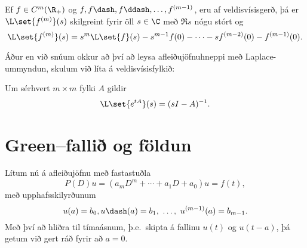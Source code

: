 \begin{se} 
Ef $f\in C\sp m(\R_+)$ og  $f, f\dash, f\ddash,
\dots, f\sp{(m-1)}$,  eru af veldisvísisgerð, þá er $\L\set{f\sp{(m)}}(s)$
skilgreint fyrir öll $s\in \C$ með  $\Re s$ nógu stórt og
 \begin{equation*}\L\set{f\sp{(m)}}(s)=s\sp
m\L\set{f}(s)-s\sp{m-1}f(0)-\cdots-sf\sp{(m-2)}(0)-f\sp{(m-1)}(0).\label{7.3.3}
 \end{equation*}
\end{se}



Áður en við snúum okkur að því að leysa afleiðujöfnuhneppi með
Laplace-ummyndun, skulum við líta á veldisvísisfylkið:


\begin{se} 
Um sérhvert $m\times m$ fylki  $A$ gildir
\begin{equation*}
\L\set{e^{tA}}(s) = (sI-A)^{-1}.
\label{7.3.4}
\end{equation*}
\end{se}  

\section{Green--fallið og  földun}


\noindent
Lítum nú á afleiðujöfnu með fastastuðla
 \begin{equation*}
P(D)u=(a_mD^m+\cdots+a_1D+a_0)u=f(t),\label{7.4.1}
 \end{equation*}
með upphafsskilyrðunum
 \begin{equation*}
u(a)=b_0, u\dash(a)=b_1,\  \dots,  \  u^{(m-1)}(a)=b_{m-1}.\label{7.4.2}
 \end{equation*}
Með því að hliðra til tímaásnum, þ.e.~skipta á fallinu $u(t)$ og
$u(t-a)$, þá getum við gert ráð fyrir að $a=0$.  


